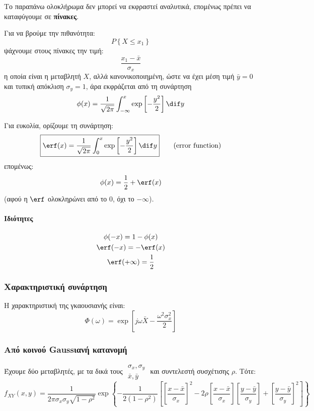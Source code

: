 \documentclass[11pt,a4paper,notitlepage,fleqn,final]{article}
\begin{document}
Το παραπάνω ολοκλήρωμα δεν μπορεί να εκφραστεί αναλυτικά, επομένως πρέπει
να καταφύγουμε σε \textbf{πίνακες}.

Για να βρούμε την πιθανότητα:
\[
P \left\lbrace X \leq x_1 \right\rbrace
\]
ψάχνουμε στους πίνακες την τιμή:
\[
\boxed{\frac{x_1-\bar x}{\sigma_x}}
\]
η οποία είναι η μεταβλητή \( X \), αλλά κανονικοποιημένη, ώστε να έχει
μέση τιμή \( \bar y = 0 \) και τυπική απόκλιση \( \sigma_y = 1 \), άρα
εκφράζεται από τη συνάρτηση \[
\phi(x) = \frac{1}{\sqrt{2\pi}}
\int_{-\infty}^{x} \exp\left[-\frac{y^2}{2}\right]\dif y
 \]

Για ευκολία, ορίζουμε τη συνάρτηση:
\[
\boxed{
	\erf(x) = \frac{1}{\sqrt{2\pi}}
	\int_{0}^{x} \exp\left[-\frac{y^2}{2}\right]\dif y
	} \qquad \text{(error function)}
\]
επομένως:
\[
\phi(x) = \frac{1}{2} + \erf(x)
\]
(αφού η \( \erf \) ολοκληρώνει από το \( 0 \), όχι το
\( -\infty \)).

\paragraph{Ιδιότητες}
\begin{gather*}
	\phi(-x) = 1-\phi(x) \\
	\erf(-x) = -\erf(x) \\
	\erf(+\infty) = \frac{1}{2}
\end{gather*}

\subsubsection{Χαρακτηριστική συνάρτηση}
Η χαρακτηριστική της γκαουσιανής είναι:
\[
\Phi(\omega ) = \exp\left[
j\omega \bar X - \frac{\omega^2\sigma_x^2}{2}
\right]
\]

\subsubsection{Από κοινού Gaussιανή κατανομή}
Έχουμε δύο μεταβλητές, με τα δικά τους \( \begin{matrix}
\sigma_x,\sigma_y \\ \bar x,\bar y
\end{matrix} \) και συντελεστή συσχέτισης \( \rho \). Τότε:
\[
	f_{XY}(x,y) = \frac{1}{2\pi \sigma_x \sigma_y \sqrt{1-\rho^2}}
	\exp\left\lbrace
	-\frac{1}{2(1-\rho^2)}\left[
	\left[
	\frac{x-\bar x}{\sigma_x}
	\right]^2 - 2\rho\left[\frac{x-\bar x}{\sigma_x}\right]\left[
	\frac{y-\bar y}{\sigma_y}
	\right] + \left[\frac{y-\bar y}{\sigma_y}\right]^2
	\right]
	 \right\rbrace
\]
\end{document}
